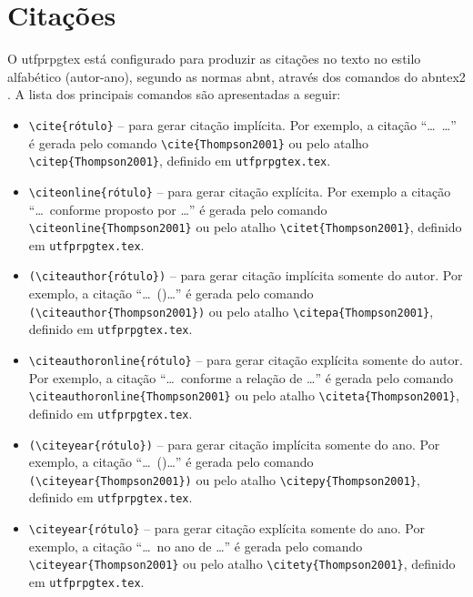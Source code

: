 \section{Citações}\label{sec:citacoes}

O \gls{utfprpgtex} está configurado para produzir as citações no texto no estilo alfabético (autor-ano), segundo as normas \gls{abnt}, através dos comandos do \gls{abntex2} \cite{abnTeX2:2013Cite,abnTeX2:2013CiteAlf}. A lista dos principais comandos são apresentadas a seguir:

\begin{itemize}%
\item \verb|\cite{rótulo}| -- para gerar citação implícita. Por exemplo, a citação ``\ldots\ \cite{Thompson2001}\ldots'' é gerada pelo comando \verb|\cite{Thompson2001}| ou pelo atalho \verb|\citep{Thompson2001}|, definido em \texttt{utfprpgtex.tex}.
\item \verb|\citeonline{rótulo}| -- para gerar citação explícita. Por exemplo a citação ``\ldots\ conforme proposto por \ldots'' é gerada pelo comando \verb|\citeonline{Thompson2001}| ou pelo atalho \verb|\citet{Thompson2001}|, definido em \texttt{utfprpgtex.tex}.
\item \verb|(\citeauthor{rótulo})| -- para gerar citação implícita somente do autor. Por exemplo, a citação ``\ldots\ (\citeauthor{Thompson2001})\ldots'' é gerada pelo comando \verb|(\citeauthor{Thompson2001})| ou pelo atalho \verb|\citepa{Thompson2001}|, definido em \texttt{utfprpgtex.tex}.
\item \verb|\citeauthoronline{rótulo}| -- para gerar citação explícita somente do autor. Por exemplo, a citação ``\ldots\ conforme a relação de \ldots'' é gerada pelo comando \verb|\citeauthoronline{Thompson2001}| ou pelo atalho \verb|\citeta{Thompson2001}|, definido em \texttt{utfprpgtex.tex}.
\item \verb|(\citeyear{rótulo})| -- para gerar citação implícita somente do ano. Por exemplo, a citação ``\ldots\ (\citeyear{Thompson2001})\ldots'' é gerada pelo comando \verb|(\citeyear{Thompson2001})| ou pelo atalho \verb|\citepy{Thompson2001}|, definido em \texttt{utfprpgtex.tex}.
\item \verb|\citeyear{rótulo}| -- para gerar citação explícita somente do ano. Por exemplo, a citação ``\ldots\ no ano de \citeyear{Thompson2001}\ldots'' é gerada pelo comando \verb|\citeyear{Thompson2001}| ou pelo atalho \verb|\citety{Thompson2001}|, definido em \texttt{utfprpgtex.tex}.
\end{itemize}

